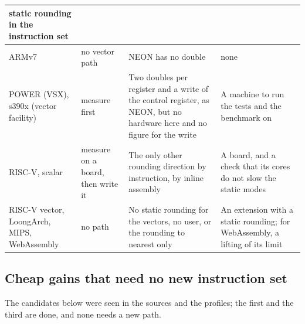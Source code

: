 \documentclass[12pt,a4paper,twoside,openright]{book}
\begin{document}
\begin{longtable}{|L{2.3cm}|L{2.3cm}|L{5.0cm}|L{3.4cm}|}
static rounding in the instruction set \\
\hline
ARMv7 & no vector path & NEON has no double & none \\
\hline
POWER (VSX), s390x (vector facility) & measure first & Two doubles per
register and a write of the control register, as NEON, but no hardware here
and no figure for the write & A machine to run the tests and the benchmark
on \\
\hline
RISC-V, scalar & measure on a board, then write it & The only other rounding
direction by instruction, by inline assembly & A board, and a check that its
cores do not slow the static modes \\
\hline
RISC-V vector, LoongArch, MIPS, WebAssembly & no path & No static rounding
for the vectors, no user, or the rounding to nearest only & An extension
with a static rounding; for WebAssembly, a lifting of its limit \\
\hline
\end{longtable}
\endgroup

\subsection{Cheap gains that need no new instruction set}

The candidates below were seen in the sources and the profiles; the first
and the third are done, and none needs a new path.
\end{document}
